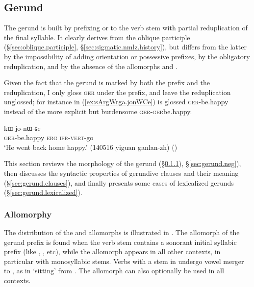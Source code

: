 \subsection{Gerund} \label{sec:gerund}
The gerund is built by prefixing  or  to the verb stem with partial reduplication of the final syllable. It clearly derives from the oblique participle (§\ref{sec:oblique.participle}, §\ref{sec:sigmatic.nmlz.history}), but differs from the latter by the impossibility of adding orientation or possessive prefixes, by the obligatory reduplication, and by the absence of the allomorphs  and . 

Given the fact that the gerund is marked by both the prefix  and the reduplication, I only gloss \textsc{ger} under the prefix, and leave the reduplication unglossed; for instance in (\ref{ex:sArgWrga.jonWCe})  is glossed \textsc{ger}-be.happy instead of the more explicit but burdensome \textsc{ger}-\textsc{ger}\redp{}be.happy.

\begin{exe}
\ex \label{ex:sArgWrga.jonWCe}
 kɯ jo-nɯ-ɕe \\
\textsc{ger}-be.happy \textsc{erg} \textsc{ifr}-\textsc{vert}-go \\
\glt `He went back home happy.' (140516 yiguan ganlan-zh) ()
\end{exe}

This section reviews the morphology of the gerund (§\ref{sec:gerund.allomorphs}), §\ref{sec:gerund.neg}), then discusses the syntactic properties of gerundive clauses and their meaning (§\ref{sec:gerund.clauses}), and finally presents some cases of lexicalized gerunds (§\ref{sec:gerund.lexicalized}).


\subsubsection{Allomorphy} \label{sec:gerund.allomorphs}
The distribution of the  and  allomorphs is illustrated in . The  allomorph of the gerund prefix is found when the verb stem contains a sonorant initial syllabic prefix (like , ,  etc), while the  allomorph appears in all other contexts, in particular with monosyllabic stems. Verbs with a stem in  undergo vowel merger  to , as in  `sitting' from . The  allomorph can also optionally be used in all contexts.

